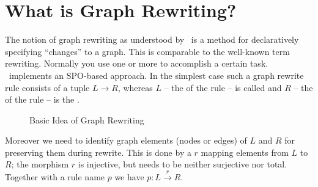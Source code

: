 \section{What is Graph Rewriting?}

The notion of graph rewriting as understood by \GrG\ is a method for declaratively specifying ``changes'' to a graph.
This is comparable to the well-known term rewriting. 
Normally you use one or more  to accomplish a certain task.
\GrG\ implements an SPO-based approach.
In the simplest case such a graph rewrite rule consists of a tuple $L \rightarrow R$, whereas $L$ -- the  of the rule -- is called  and $R$ -- the  of the rule -- is the .

\begin{figure}[htbp]
	\centering
  \caption{Basic Idea of Graph Rewriting}
  \label{figrule}
\end{figure}

Moreover we need to identify graph elements (nodes or edges) of $L$ and $R$ for preserving them during rewrite. 
This is done by a  $r$ mapping elements from $L$ to $R$; the morphism $r$ is injective, but needs to be neither surjective nor total.
Together with a rule name $p$ we have $p : L \xrightarrow{r} R$.

